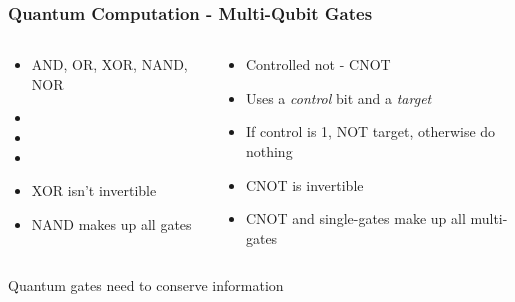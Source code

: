 \documentclass[aspectratio=169]{beamer}
\begin{document}
\begin{frame}
    \frametitle{Quantum Computation - Multi-Qubit Gates}
    \begin{columns}
        \begin{column}{0.5\textwidth}
            \begin{itemize}
                \item AND, OR, XOR, NAND, NOR
                \item[]
                \item[]
                \item[] 
                \item XOR isn't invertible
                \item NAND makes up all gates
            \end{itemize}
        \end{column}
        \begin{column}{0.5\textwidth}
            \begin{itemize}
                \item Controlled not - CNOT
                \item Uses a \emph{control} bit and a \emph{target}
                \item If control is 1, NOT target, otherwise do nothing
                \item CNOT is invertible
                \item CNOT and single-gates make up all multi-gates
            \end{itemize}
        \end{column}
    \end{columns}
    \begin{alertblock}{}
        \centering Quantum gates need to conserve information
    \end{alertblock}
\end{frame}
\end{document}
